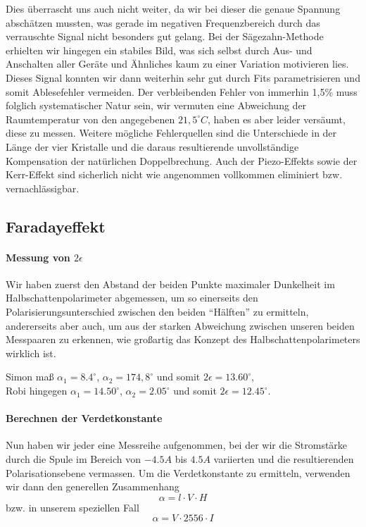  Dies überrascht uns auch nicht weiter, da wir bei dieser die genaue Spannung abschätzen mussten, was gerade im negativen Frequenzbereich durch das verrauschte Signal nicht besonders gut gelang. Bei der Sägezahn-Methode erhielten wir hingegen ein stabiles Bild, was sich selbst durch Aus- und Anschalten aller Geräte und Ähnliches kaum zu einer Variation motivieren lies. Dieses Signal konnten wir dann weiterhin sehr gut durch Fits parametrisieren und somit Ablesefehler vermeiden. Der verbleibenden Fehler von immerhin 1,5\% muss folglich systematischer Natur sein, wir vermuten eine Abweichung der Raumtemperatur von den angegebenen $21,5^\circ C$, haben es aber leider versäumt, diese zu messen. Weitere mögliche Fehlerquellen sind die Unterschiede in der Länge der vier Kristalle und die daraus resultierende unvollständige Kompensation der natürlichen Doppelbrechung. Auch der Piezo-Effekts sowie der Kerr-Effekt sind sicherlich nicht wie angenommen vollkommen eliminiert bzw. vernachlässigbar.


\subsection{Faradayeffekt}

\paragraph{Messung von $2\epsilon$}
Wir haben zuerst den Abstand der beiden Punkte maximaler Dunkelheit im Halbschattenpolarimeter abgemessen, um so einerseits den Polarisierungsunterschied zwischen den beiden "`Hälften"' zu ermitteln, andererseits aber auch, um aus der starken Abweichung zwischen unseren beiden Messpaaren zu erkennen, wie großartig das Konzept des Halbschattenpolarimeters wirklich ist.

Simon maß $\alpha_1 = 8.4^\circ$, $\alpha_2 = 174,8^\circ$ und somit $ 2\epsilon = 13.60^\circ $,\\ Robi hingegen $\alpha_1 = 14.50^\circ$, $\alpha_2 = 2.05^\circ$ und somit $ 2\epsilon = 12.45^\circ $.


\paragraph{Berechnen der Verdetkonstante}

Nun haben wir jeder eine Messreihe aufgenommen, bei der wir die Stromstärke durch die Spule im Bereich von $-4.5 A$ bis $4.5 A$ variierten und die resultierenden Polarisationsebene vermassen. Um die Verdetkonstante zu ermitteln, verwenden wir dann den generellen Zusammenhang
$$ \alpha = l \cdot V \cdot H $$
bzw. in unserem speziellen Fall
$$ \alpha = V \cdot 2556 \cdot I $$
  
